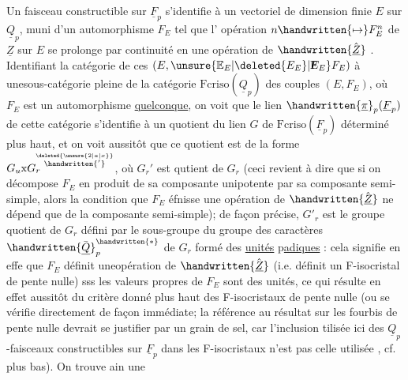 Un faisceau constructible sur $\underline{F}_p$ s'identifie à un vectoriel de dimension finie $E$ sur $\underline{Q}_p$, muni d'un automorphisme $F_E$ tel que l' opération $n\handwritten{\mapsto}F_E^n$ de $\underline{Z}$ sur $E$ se prolonge par continuité en une opération de  $\handwritten{\hat{\underline{Z}}}$ . Identifiant  la catégorie de ces $(E,\unsure{\mathbb{E}_E|\deleted{E_E}|\rlap{F}E_E}F_E)$ à unesous-catégorie pleine de la catégorie  $\mathrm{Fcriso}(\underline{Q}_p)$ des couples $(E,F_E)$, où $F_E$ est un automorphisme \uline{quelconque}, on voit que le lien  $\handwritten{\underline{\pi}}_p(\underline{F}_p)$ de cette catégorie s'identifie à un quotient du lien $G$ de $\mathrm{Fcriso}(\underline{F}_p)$ déterminé plus haut, et on voit aussitôt que ce quotient est de la forme $G_u\mathrm{x}G_r^{\overset{\deleted{\unsure{2|a|x}}}{\handwritten{'}}}$, où $G_r'$ est  qutient de $G_r$ (ceci revient à dire que si on décompose $F_E$ en produit de sa composante unipotente par sa composante semi-simple, alors la condition que $F_E$ éfnisse une opération de $\handwritten{\hat{\underline{Z}}}$ ne dépend que de la composante semi-simple); de façon précise, $G'_r$ est le groupe quotient de $G_r$ défini par le sous-groupe du groupe des caractères $\handwritten{\bar{\underline{Q}}}_p^{\handwritten{*}}$ de $G_r$ formé des \uline{unités} p\uline{adiques} : cela signifie en effe que $F_E$ définit uneopération de  $\handwritten{\hat{\underline{Z}}}$ (i.e. définit un F-isocristal de pente nulle) sss les valeurs propres de $F_E$ sont des unités, ce qui résulte en effet aussitôt du critère donné plus haut des F-isocristaux de pente nulle (ou se vérifie directement de façon immédiate; la référence au résultat sur les fourbis de pente nulle devrait se justifier par un grain de sel, car l'inclusion tilisée ici des $\underline{Q}_p$-faisceaux constructibles sur $\underline{F}_p$ dans les F-isocristaux n'est pas celle utilisée , cf. plus bas). On trouve ain une 